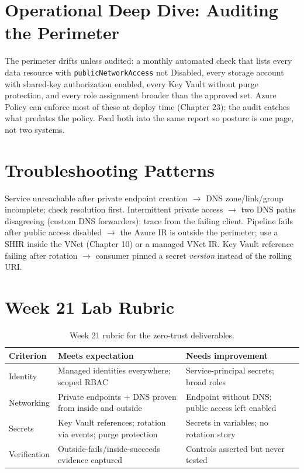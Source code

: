 \section{Operational Deep Dive: Auditing the Perimeter}
The perimeter drifts unless audited: a monthly automated check that lists every data resource with \texttt{publicNetworkAccess} not Disabled, every storage account with shared-key authorization enabled, every Key Vault without purge protection, and every role assignment broader than the approved set. Azure Policy can enforce most of these at deploy time (Chapter 23); the audit catches what predates the policy. Feed both into the same report so posture is one page, not two systems.

\section{Troubleshooting Patterns}
Service unreachable after private endpoint creation $\rightarrow$ DNS zone/link/group incomplete; check resolution first. Intermittent private access $\rightarrow$ two DNS paths disagreeing (custom DNS forwarders); trace from the failing client. Pipeline fails after public access disabled $\rightarrow$ the Azure IR is outside the perimeter; use a SHIR inside the VNet (Chapter 10) or a managed VNet IR. Key Vault reference failing after rotation $\rightarrow$ consumer pinned a secret \emph{version} instead of the rolling URI.

\section{Week 21 Lab Rubric}
\begin{table}[H]
\centering
\small
\begin{tabular}{@{}p{3.2cm}p{5.0cm}p{5.0cm}@{}}
\toprule
\textbf{Criterion} & \textbf{Meets expectation} & \textbf{Needs improvement} \\
\midrule
Identity & Managed identities everywhere; scoped RBAC & Service-principal secrets; broad roles \\
Networking & Private endpoints + DNS proven from inside and outside & Endpoint without DNS; public access left enabled \\
Secrets & Key Vault references; rotation via events; purge protection & Secrets in variables; no rotation story \\
Verification & Outside-fails/inside-succeeds evidence captured & Controls asserted but never tested \\
\bottomrule
\end{tabular}
\caption{Week 21 rubric for the zero-trust deliverables.}
\label{tab:ch21-rubric}
\end{table}

